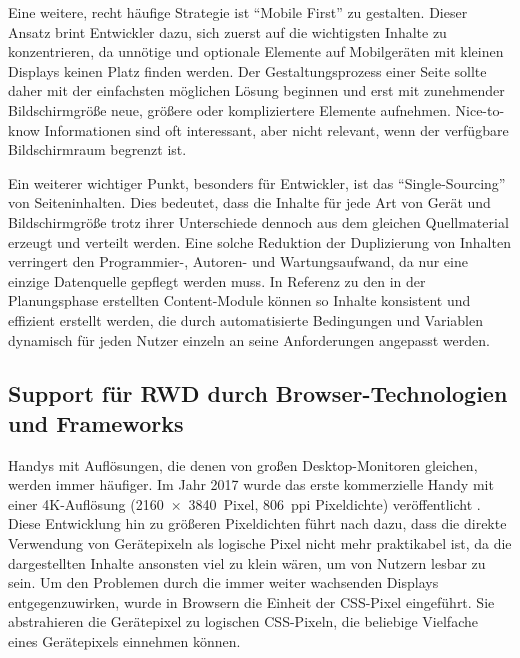 Eine weitere, recht häufige Strategie ist "`Mobile First"' \autocite{Wroblewski.MobileFirst.2009} zu gestalten.
Dieser Ansatz brint Entwickler dazu, sich zuerst auf die wichtigsten Inhalte zu konzentrieren, da unnötige und optionale Elemente auf Mobilgeräten mit kleinen Displays keinen Platz finden werden.
Der Gestaltungsprozess einer Seite sollte daher mit der einfachsten möglichen Lösung beginnen und erst mit zunehmender Bildschirmgröße neue, größere oder kompliziertere Elemente aufnehmen.
Nice-to-know Informationen sind oft interessant, aber nicht relevant, wenn der verfügbare Bildschirmraum begrenzt ist.

Ein weiterer wichtiger Punkt, besonders für Entwickler, ist das "`Single-Sourcing"' \autocite[S. 3--4]{Katajisto.CreatingSupportContent.2015} von Seiteninhalten.
Dies bedeutet, dass die Inhalte für jede Art von Gerät und Bildschirmgröße trotz ihrer Unterschiede dennoch aus dem gleichen Quellmaterial erzeugt und verteilt werden.
Eine solche Reduktion der Duplizierung von Inhalten verringert den Programmier-, Autoren- und Wartungsaufwand, da nur eine einzige Datenquelle gepflegt werden muss.
In Referenz zu den in der Planungsphase erstellten Content-Module können so Inhalte konsistent und effizient erstellt werden, die durch automatisierte Bedingungen und Variablen dynamisch für jeden Nutzer einzeln an seine Anforderungen angepasst werden.


\subsection{Support für RWD durch Browser-Technologien und Frameworks}

Handys mit Auflösungen, die denen von großen Desktop-Monitoren gleichen, werden immer häufiger.
Im Jahr 2017 wurde das erste kommerzielle Handy mit einer 4K-Auflösung (2160 × 3840 Pixel, 806 ppi Pixeldichte) veröffentlicht \autocite{Wikipedia.SonyXperiaZ5Premium.2024}.
Diese Entwicklung hin zu größeren Pixeldichten führt nach \autocite{Harmsen.2018} dazu, dass die direkte Verwendung von Gerätepixeln als logische Pixel nicht mehr praktikabel ist, da die dargestellten Inhalte ansonsten viel zu klein wären, um von Nutzern lesbar zu sein.
Um den Problemen durch die immer weiter wachsenden Displays entgegenzuwirken, wurde in Browsern die Einheit der CSS-Pixel eingeführt.
Sie abstrahieren die Gerätepixel zu logischen CSS-Pixeln, die beliebige Vielfache eines Gerätepixels einnehmen können.

